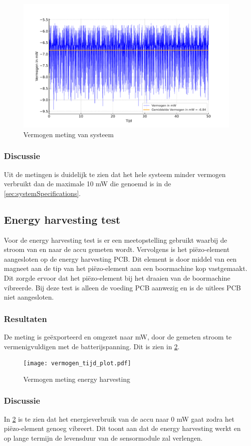 \begin{figure}[!htbp]
    \centering
    \includegraphics[width=\textwidth]{img/vermogensMeting.pdf}
    \caption{Vermogen meting van systeem}
    \label{fig:vermogenMeting}
\end{figure}

\subsubsection{Discussie}
Uit de metingen is duidelijk te zien dat het hele systeem minder vermogen verbruikt dan de maximale 10 mW die genoemd is in de \cref{sec:systemSpecifications}.


\subsection{Energy harvesting test}
Voor de energy harvesting test is er een meetopstelling gebruikt waarbij de stroom van en naar de accu gemeten wordt. Vervolgens is het piëzo-element aangesloten op de energy harvesting PCB. Dit element is door middel van een magneet aan de tip van het piëzo-element aan een boormachine kop vastgemaakt. Dit zorgde ervoor dat het piëzo-element bij het draaien van de boormachine vibreerde. Bij deze test is alleen de voeding PCB aanwezig en is de uitlees PCB niet aangesloten.

\subsubsection{Resultaten}
De meting is geëxporteerd en omgezet naar mW, door de gemeten stroom te vermenigvuldigen met de batterijspanning. Dit is zien in \cref{fig:vermogenPlot}.

\begin{figure}[!htbp]
    \centering
    \texttt{[image: vermogen\_tijd\_plot.pdf]}
    \caption{Vermogen meting energy harvesting}
    \label{fig:vermogenPlot}
\end{figure}

\subsubsection{Discussie}
In \cref{fig:vermogenPlot} is te zien dat het energieverbruik van de accu naar 0 mW gaat zodra het piëzo-element genoeg vibreert. Dit toont aan dat de energy harvesting werkt en op lange termijn de levensduur van de sensormodule zal verlengen.